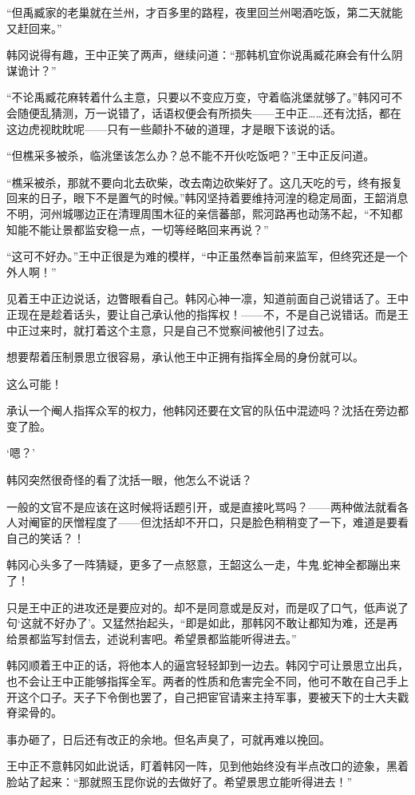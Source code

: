 “但禹臧家的老巢就在兰州，才百多里的路程，夜里回兰州喝酒吃饭，第二天就能又赶回来。”

韩冈说得有趣，王中正笑了两声，继续问道：“那韩机宜你说禹臧花麻会有什么阴谋诡计？”

“不论禹臧花麻转着什么主意，只要以不变应万变，守着临洮堡就够了。”韩冈可不会随便乱猜测，万一说错了，话语权便会有所损失——王中正……还有沈括，都在这边虎视眈眈呢——只有一些颠扑不破的道理，才是眼下该说的话。

“但樵采多被杀，临洮堡该怎么办？总不能不开伙吃饭吧？”王中正反问道。

“樵采被杀，那就不要向北去砍柴，改去南边砍柴好了。这几天吃的亏，终有报复回来的日子，眼下不是置气的时候。”韩冈坚持着要维持河湟的稳定局面，王韶消息不明，河州城哪边正在清理周围木征的亲信蕃部，熙河路再也动荡不起，“不知都知能不能让景都监安稳一点，一切等经略回来再说？”

“这可不好办。”王中正很是为难的模样，“中正虽然奉旨前来监军，但终究还是一个外人啊！”

见着王中正边说话，边瞥眼看自己。韩冈心神一凛，知道前面自己说错话了。王中正现在是趁着话头，要让自己承认他的指挥权！——不，不是自己说错话。而是王中正过来时，就打着这个主意，只是自己不觉察间被他引了过去。

想要帮着压制景思立很容易，承认他王中正拥有指挥全局的身份就可以。

这么可能！

承认一个阉人指挥众军的权力，他韩冈还要在文官的队伍中混迹吗？沈括在旁边都变了脸。

‘嗯？’

韩冈突然很奇怪的看了沈括一眼，他怎么不说话？

一般的文官不是应该在这时候将话题引开，或是直接叱骂吗？——两种做法就看各人对阉宦的厌憎程度了——但沈括却不开口，只是脸色稍稍变了一下，难道是要看自己的笑话？！

韩冈心头多了一阵猜疑，更多了一点怒意，王韶这么一走，牛鬼.蛇神全都蹦出来了！

只是王中正的进攻还是要应对的。却不是同意或是反对，而是叹了口气，低声说了句‘这就不好办了’。又猛然抬起头，“即是如此，那韩冈不敢让都知为难，还是再给景都监写封信去，述说利害吧。希望景都监能听得进去。”

韩冈顺着王中正的话，将他本人的逼宫轻轻卸到一边去。韩冈宁可让景思立出兵，也不会让王中正能够指挥全军。两者的性质和危害完全不同，他可不敢在自己手上开这个口子。天子下令倒也罢了，自己把宦官请来主持军事，要被天下的士大夫戳脊梁骨的。

事办砸了，日后还有改正的余地。但名声臭了，可就再难以挽回。

王中正不意韩冈如此说话，盯着韩冈一阵，见到他始终没有半点改口的迹象，黑着脸站了起来：“那就照玉昆你说的去做好了。希望景思立能听得进去！”

